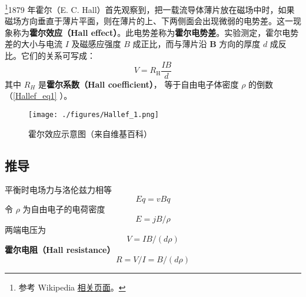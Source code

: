 
\begin{issues}
\issueDraft
\end{issues}

\footnote{参考 Wikipedia \href{https://en.wikipedia.org/wiki/Hall_effect}{相关页面}。}1879 年霍尔（E. C. Hall）首先观察到，把一载流导体薄片放在磁场中时，如果磁场方向垂直于薄片平面，则在薄片的上、下两侧面会出现微弱的电势差。这一现象称为\textbf{霍尔效应（Hall effect）}。此电势差称为\textbf{霍尔电势差}。实验测定，霍尔电势差的大小与电流 $I$ 及磁感应强度 $B$ 成正比，而与薄片沿 $\mathbf B$ 方向的厚度 $d$ 成反比。它们的关系可写成：
\begin{equation}
V = R_{\mathrm{H}} \frac{I B}{d}
\end{equation}
其中 $R_H$ 是\textbf{霍尔系数（Hall coefficient）}， 等于自由电子体密度 $\rho$ 的倒数（\autoref{Hallef_eq1} ）。

\begin{figure}[ht]
\centering
\texttt{[image: ./figures/Hallef\_1.png]}
\caption{霍尔效应示意图（来自维基百科）} \label{Hallef_fig1}
\end{figure}

\subsection{推导}
平衡时电场力与洛伦兹力相等
\begin{equation}
Eq = vBq
\end{equation}
令 $\rho$ 为自由电子的电荷密度
\begin{equation}
E = jB/\rho
\end{equation}
两端电压为
\begin{equation}\label{Hallef_eq1}
V = IB/(d\rho)
\end{equation}
\textbf{霍尔电阻（Hall resistance）}
\begin{equation}
R = V/I = B/(d\rho)
\end{equation}
